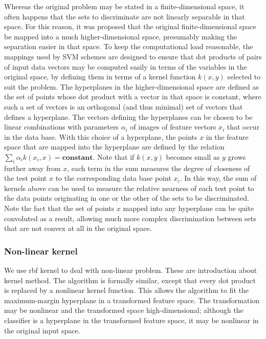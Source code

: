 Whereas the original problem may be stated in a finite-dimensional space, it often happens that the sets to discriminate are not linearly separable in that space. For this reason, it was proposed that the original finite-dimensional space be mapped into a much higher-dimensional space, presumably making the separation easier in that space. To keep the computational load reasonable, the mappings used by SVM schemes are designed to ensure that dot products of pairs of input data vectors may be computed easily in terms of the variables in the original space, by defining them in terms of a kernel function \(k(x, y)\) selected to suit the problem. The hyperplanes in the higher-dimensional space are defined as the set of points whose dot product with a vector in that space is constant, where such a set of vectors is an orthogonal (and thus minimal) set of vectors that defines a hyperplane. The vectors defining the hyperplanes can be chosen to be linear combinations with parameters \(\alpha_i\) of images of feature vectors \(x_i\) that occur in the data base. With this choice of a hyperplane, the points \(x\) in the feature space that are mapped into the hyperplane are defined by the relation \(\textstyle\sum_i \alpha_i k(x_i, x) = \textbf{constant}.\)  Note that if  \(k(x, y)\) becomes small as \(y\) grows further away from \(x\), each term in the sum measures the degree of closeness of the test point \(x\) to the corresponding data base point \(x_i\). In this way, the sum of kernels above can be used to measure the relative nearness of each test point to the data points originating in one or the other of the sets to be discriminated. Note the fact that the set of points \(x\) mapped into any hyperplane can be quite convoluted as a result, allowing much more complex discrimination between sets that are not convex at all in the original space.
\\


\subsubsection{\textbf{Non-linear kernel}}
We use rbf kernel to deal with non-linear problem. These are introduction about kernel method. The algorithm is formally similar, except that every dot product is replaced by a nonlinear kernel function. This allows the algorithm to fit the maximum-margin hyperplane in a transformed feature space. The transformation may be nonlinear and the transformed space high-dimensional; although the classifier is a hyperplane in the transformed feature space, it may be nonlinear in the original input space.
\\

